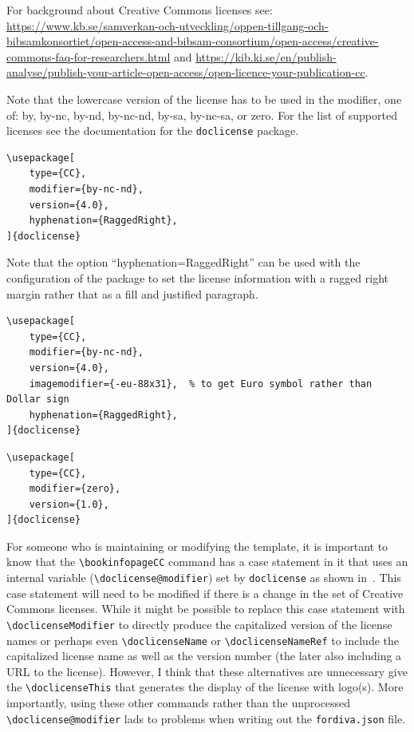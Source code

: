 For background about Creative Commons licenses see:
\url{https://www.kb.se/samverkan-och-utveckling/oppen-tillgang-och-bibsamkonsortiet/open-access-and-bibsam-consortium/open-access/creative-commons-faq-for-researchers.html} and \url{https://kib.ki.se/en/publish-analyse/publish-your-article-open-access/open-licence-your-publication-cc}.

Note that the lowercase version of the license has to be used in the modifier, \ie one of: by, by-nc, by-nd, by-nc-nd, by-sa, by-nc-sa, or zero. For the list of supported licenses see the documentation for the \texttt{doclicense} package.

\begin{lstlisting}[language={[LaTeX]TeX}, caption={Example configuration to have a CC BY-NC-ND license}, label=lst:CCBY-NC-ND]
\usepackage[
    type={CC},
    modifier={by-nc-nd},
    version={4.0},
    hyphenation={RaggedRight},
]{doclicense}
\end{lstlisting}

Note that the option ``hyphenation={RaggedRight}'' can be used with the configuration of the package to set the license information with a ragged right margin rather that as a fill and justified paragraph.

\begin{lstlisting}[language={[LaTeX]TeX}, caption={Example configuration to have a CC BY-NC-ND license with a Euro symbol rather than a Dollar sign}, label=lst:CCBY-NC-ND-euro]
\usepackage[
    type={CC},
    modifier={by-nc-nd},
    version={4.0},
    imagemodifier={-eu-88x31},  % to get Euro symbol rather than Dollar sign
    hyphenation={RaggedRight},
]{doclicense}
\end{lstlisting}

\begin{lstlisting}[language={[LaTeX]TeX}, caption={Example configuration to have a CC0 license}, label=lst:CCzero]
\usepackage[
    type={CC},
    modifier={zero},
    version={1.0},
]{doclicense}
\end{lstlisting}


For someone who is maintaining or modifying the template, it is important to know that the \texttt{\textbackslash bookinfopageCC} command has a case statement in it that uses an internal variable (\texttt{\textbackslash doclicense@modifier}) set by \texttt{doclicense} as shown in~. This case statement will need to be modified if there is a change in the set of Creative Commons licenses. While it might be possible to replace this case statement with \texttt{\textbackslash doclicenseModifier} to directly produce the capitalized version of the license names or perhaps even \texttt{\textbackslash doclicenseName} or \texttt{\textbackslash doclicenseNameRef} to include the capitalized license name as well as the version number (the later also including a URL to the license). However, I think that these alternatives are unnecessary give the \texttt{\textbackslash doclicenseThis} that generates the display of the license with logo(s). More importantly, using these other commands rather than the unprocessed \texttt{\textbackslash doclicense@modifier} lads to problems when writing out the \texttt{fordiva.json} file.

